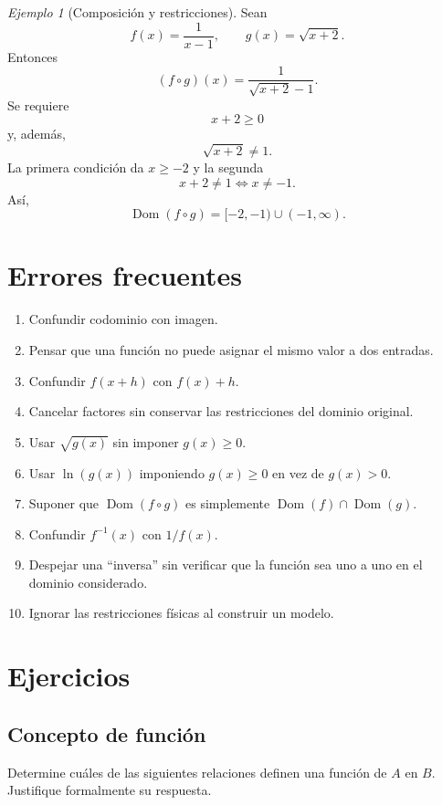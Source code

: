 \documentclass[12pt]{article}
\theoremstyle{remark}
\newtheorem{ejemplo}{Ejemplo}[section]
\newcommand{\Dom}{\operatorname{Dom}}
\begin{document}
\begin{ejemplo}[Composición y restricciones]
Sean
\[
f(x)=\frac{1}{x-1},
\qquad
g(x)=\sqrt{x+2}.
\]
Entonces
\[
(f\circ g)(x)
=\frac{1}{\sqrt{x+2}-1}.
\]
Se requiere
\[
x+2\geq0
\]
y, además,
\[
\sqrt{x+2}\neq1.
\]
La primera condición da $x\geq-2$ y la segunda
\[
x+2\neq1\Longleftrightarrow x\neq-1.
\]
Así,
\[
\Dom(f\circ g)=[-2,-1)\cup(-1,\infty).
\]
\end{ejemplo}

\section{Errores frecuentes}

\begin{enumerate}
    \item Confundir codominio con imagen.
    \item Pensar que una función no puede asignar el mismo valor a dos entradas.
    \item Confundir $f(x+h)$ con $f(x)+h$.
    \item Cancelar factores sin conservar las restricciones del dominio original.
    \item Usar $\sqrt{g(x)}$ sin imponer $g(x)\geq0$.
    \item Usar $\ln(g(x))$ imponiendo $g(x)\geq0$ en vez de $g(x)>0$.
    \item Suponer que $\Dom(f\circ g)$ es simplemente
    $\Dom(f)\cap\Dom(g)$.
    \item Confundir $f^{-1}(x)$ con $1/f(x)$.
    \item Despejar una ``inversa'' sin verificar que la función sea uno a uno en
    el dominio considerado.
    \item Ignorar las restricciones físicas al construir un modelo.
\end{enumerate}

\section{Ejercicios}

\subsection{Concepto de función}

Determine cuáles de las siguientes relaciones definen una función de $A$ en
$B$. Justifique formalmente su respuesta.
\end{document}
